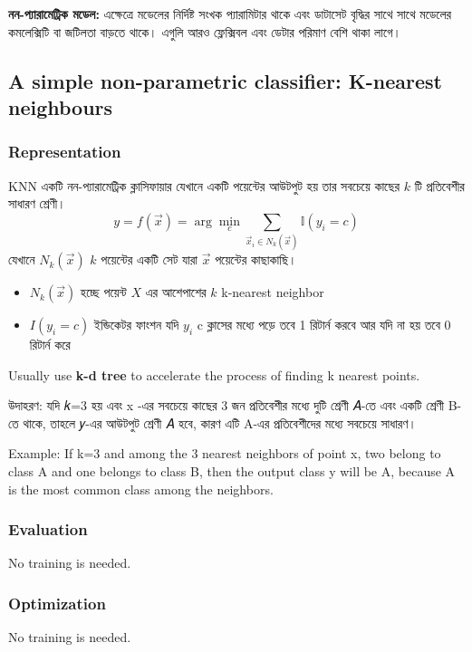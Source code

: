 \documentclass[graybox, envcountchap, twocolumn]{styles/svmult}
\begin{document}
\textbf{নন-প্যারামেট্রিক মডেল:} এক্ষেত্রে মডেলের নির্দিষ্ট সংখক প্যারামিটার থাকে এবং ডাটাসেট বৃদ্ধির সাথে সাথে মডেলের কমলেক্সিটি বা জটিলতা বাড়তে থাকে।  এগুলি আরও ফ্লেক্সিবল এবং ডেটার পরিমাণ বেশি থাকা লাগে। 

\subsection{A simple non-parametric classifier: K-nearest neighbours}

\subsubsection{Representation}

KNN একটি নন-প্যারামেট্রিক ক্লাসিফায়ার যেখানে একটি পয়েন্টের আউটপুট হয় তার সবচেয়ে কাছের $𝑘$ টি প্রতিবেশীর সাধারণ শ্রেণী।
\begin{equation}
y=f(\vec{x})=\arg\min_{c}{\sum\limits_{\vec{x}_i \in N_k(\vec{x})} \mathbb{I}(y_i=c)}
\end{equation}
যেখানে $N_k(\vec{x})$  $k$ পয়েন্টের একটি সেট যারা  $\vec{x}$ পয়েন্টের কাছাকাছি। 
\begin{itemize}
    \item $N_k(\vec{x})$ হচ্ছে পয়েন্ট $X$ এর আশেপাশের $𝑘$ k-nearest neighbor
    \item ${I}(y_i=c)$ ইন্ডিকেটর ফাংশন যদি $y_i$ c ক্লাসের মধ্যে পড়ে তবে 1 রিটার্ন করবে আর যদি না হয় তবে 0 রিটার্ন করে
\end{itemize}

Usually use \textbf{k-d tree} to accelerate the process of finding k nearest points.

উদাহরণ: যদি 𝑘=3 হয় এবং x -এর সবচেয়ে কাছের 3 জন প্রতিবেশীর মধ্যে দুটি শ্রেণী 𝐴-তে এবং একটি শ্রেণী B-তে থাকে, তাহলে 𝑦-এর আউটপুট শ্রেণী 𝐴 হবে, কারণ এটি A-এর প্রতিবেশীদের মধ্যে সবচেয়ে সাধারণ।

Example: If k=3 and among the 3 nearest neighbors of point x, two belong to class A and one belongs to class B, then the output class y will be A, because A is the most common class among the neighbors.

\subsubsection{Evaluation}
No training is needed.

\subsubsection{Optimization}
No training is needed.
\end{document}
